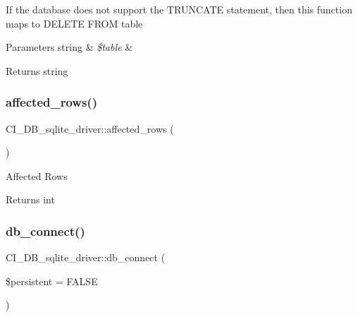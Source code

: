 If the database does not support the T\+R\+U\+N\+C\+A\+TE statement, then this function maps to \textquotesingle{}D\+E\+L\+E\+TE F\+R\+OM table\textquotesingle{}


\begin{DoxyParams}[1]{Parameters}
string & {\em \$table} & \\
\hline
\end{DoxyParams}
\begin{DoxyReturn}{Returns}
string 
\end{DoxyReturn}
\mbox{\label{class_c_i___d_b__sqlite__driver_adae2e03033a9706676a856792743bf9c}} 
\subsubsection{\texorpdfstring{affected\+\_\+rows()}{affected\_rows()}}
{\footnotesize\ttfamily C\+I\+\_\+\+D\+B\+\_\+sqlite\+\_\+driver\+::affected\+\_\+rows (\begin{DoxyParamCaption}{ }\end{DoxyParamCaption})}

Affected Rows

\begin{DoxyReturn}{Returns}
int 
\end{DoxyReturn}
\mbox{\label{class_c_i___d_b__sqlite__driver_ab602eec8f573aa629059d7cd3753eeae}} 
\subsubsection{\texorpdfstring{db\+\_\+connect()}{db\_connect()}}
{\footnotesize\ttfamily C\+I\+\_\+\+D\+B\+\_\+sqlite\+\_\+driver\+::db\+\_\+connect (\begin{DoxyParamCaption}\item[{}]{\$persistent = {\ttfamily FALSE} }\end{DoxyParamCaption})}

